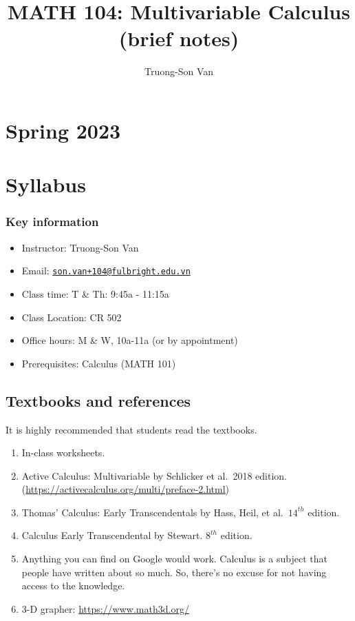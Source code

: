 \documentclass[
]{article}
\title{MATH 104: Multivariable Calculus (brief notes)}
\author{Truong-Son Van}
\date{}
\providecommand{\tightlist}{%
  \setlength{\itemsep}{0pt}\setlength{\parskip}{0pt}}
\begin{document}
\maketitle

{
\setcounter{tocdepth}{2}
\tableofcontents
}
\hypertarget{spring-2023}{%
\section*{Spring 2023}\label{spring-2023}}

\hypertarget{syllabus}{%
\section*{Syllabus}\label{syllabus}}

\hypertarget{key-information}{%
\subsubsection*{Key information}\label{key-information}}

\begin{itemize}
\tightlist
\item
  Instructor: Truong-Son Van
\item
  Email: \href{mailto:son.van+104@fulbright.edu.vn}{\nolinkurl{son.van+104@fulbright.edu.vn}}
\item
  Class time: T \& Th: 9:45a - 11:15a
\item
  Class Location: CR 502
\item
  Office hours: M \& W, 10a-11a (or by appointment)
\item
  Prerequisites: Calculus (MATH 101)
\end{itemize}

\hypertarget{textbooks-and-references}{%
\subsection*{Textbooks and references}\label{textbooks-and-references}}

It is highly recommended that students read the textbooks.

\begin{enumerate}
\def\labelenumi{\arabic{enumi}.}
\item
  In-class worksheets.
\item
  Active Calculus: Multivariable by Schlicker et al.~2018 edition.
  (\url{https://activecalculus.org/multi/preface-2.html})
\item
  Thomas' Calculus: Early Transcendentals by Hass, Heil, et al.~\(14^{th}\) edition.
\item
  Calculus Early Transcendental by Stewart. \(8^{th}\) edition.
\item
  Anything you can find on Google would work.
  Calculus is a subject that people have written about
  so much. So, there's no excuse for not having access
  to the knowledge.
\item
  3-D grapher: \url{https://www.math3d.org/}
\end{enumerate}
\end{document}

